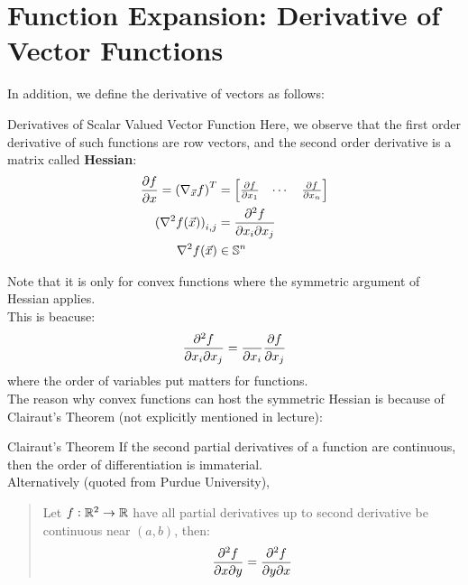 \section{Function Expansion: Derivative of Vector Functions}
In addition, we define the derivative of vectors as follows:
\begin{ln-define}{Derivatives of Scalar Valued Vector Function}{}
    Here, we observe that the first order derivative of such functions are row vectors, and the second order derivative is a matrix called \textbf{Hessian}:
    \begin{align*}
        \pdv{f}{x} = {(\nabla_{\vec{x}}f)}^T &= \begin{bmatrix} \pdv{f}{x_1} & \cdots & \pdv{f}{x_n} \end{bmatrix} \\
        {(\nabla^2 f(\vec{x}))}_{i,j} &= \pdv{f}{x_i}{x_j} \\
        \nabla^2 f(\vec{x}) &\in \mathbb{S}^n
    \end{align*}
\end{ln-define}
Note that it is only for convex functions where the symmetric argument of Hessian applies. \\
This is beacuse:
\[
    \pdv{f}{x_i}{x_j} = \frac{}{\partial x_i} \pdv{f}{x_j}
\]
where the order of variables put matters for functions. \\
The reason why convex functions can host the symmetric Hessian is because of Clairaut's Theorem (not explicitly mentioned in lecture):
\begin{ln-theorem}{Clairaut's Theorem}{}
    If the second partial derivatives of a function are continuous, then the order of differentiation is immaterial. \\
    Alternatively (quoted from Purdue University),
    \begin{quote}
        Let $f : \mathbb{R}^2 \rightarrow \mathbb{R}$ have all partial derivatives up to second derivative be continuous near $(a, b)$, then:
        \[
            \pdv{f}{x}{y} (a, b) = \pdv{f}{y}{x} (a, b)
        \]
    \end{quote}
\end{ln-theorem}

